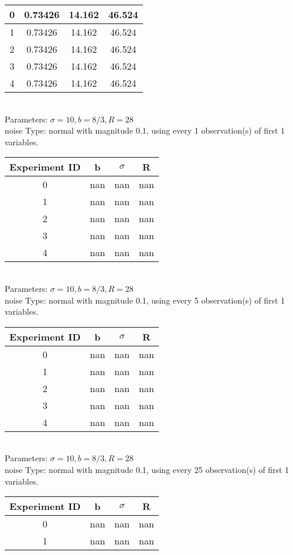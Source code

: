 \begin{multicols}{3}
\begin{tabular}{cccc}
0 & 0.73426 & 14.162 & 46.524\\ \hline 
 1 & 0.73426 & 14.162 & 46.524\\ \hline 
 2 & 0.73426 & 14.162 & 46.524\\ \hline 
 3 & 0.73426 & 14.162 & 46.524\\ \hline 
 4 & 0.73426 & 14.162 & 46.524\\ \hline 
 \end{tabular}\\
Parameters: $\sigma=10, b=8/3, R=28$\\
noise Type: normal with magnitude 0.1, using every 1 observation(s) of first 1 variables.\\
\begin{tabular}{cccc}
\hline Experiment ID & b & $\sigma$ & R \\ \hline 
0 & nan & nan & nan\\ \hline 
 1 & nan & nan & nan\\ \hline 
 2 & nan & nan & nan\\ \hline 
 3 & nan & nan & nan\\ \hline 
 4 & nan & nan & nan\\ \hline 
 \end{tabular}\\
Parameters: $\sigma=10, b=8/3, R=28$\\
noise Type: normal with magnitude 0.1, using every 5 observation(s) of first 1 variables.\\
\begin{tabular}{cccc}
\hline Experiment ID & b & $\sigma$ & R \\ \hline 
0 & nan & nan & nan\\ \hline 
 1 & nan & nan & nan\\ \hline 
 2 & nan & nan & nan\\ \hline 
 3 & nan & nan & nan\\ \hline 
 4 & nan & nan & nan\\ \hline 
 \end{tabular}\\
Parameters: $\sigma=10, b=8/3, R=28$\\
noise Type: normal with magnitude 0.1, using every 25 observation(s) of first 1 variables.\\
\begin{tabular}{cccc}
\hline Experiment ID & b & $\sigma$ & R \\ \hline 
0 & nan & nan & nan\\ \hline 
 1 & nan & nan & nan\\ \hline 

\end{tabular}
\end{multicols}
